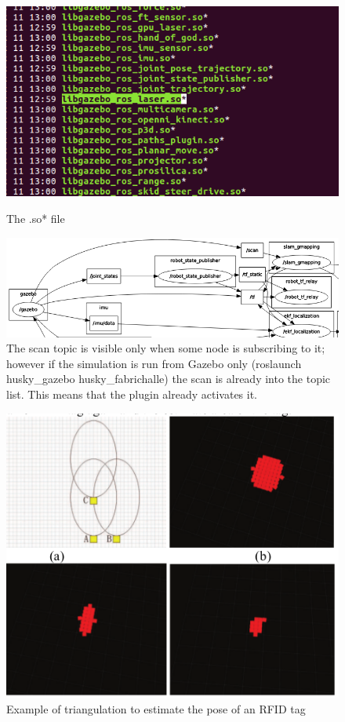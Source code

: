 \documentclass[11pt,a4paper]{article}
\begin{document}
\begin{figure}[!h]
    \centering
    \begin{minipage}{.5\textwidth}
        \centering
        \includegraphics[width=0.8\linewidth, height=0.2\textheight]{figures/laser_plugin}
        \caption{The .so* file}
        \label{fig:}
    \end{minipage}%
    \begin{minipage}{0.5\textwidth}
        \centering
        \includegraphics[width=1\linewidth, height=0.15\textheight]{figures/scan_topic}
        \caption{The scan topic is visible only when some node is subscribing to it; however if the simulation is run from Gazebo only (roslaunch husky{\_}gazebo husky{\_}fabrichalle) the scan is already into the topic list. This means that the plugin already activates it.}
        \label{fig:}
    \end{minipage}
 \end{figure}

\begin{figure}[H]
	\center
	\includegraphics[width=.4\textwidth]{figures/tags.png}
	\caption{Example of triangulation to estimate the pose of an RFID tag}
	\label{fig:tag}
\end{figure}
\end{document}
